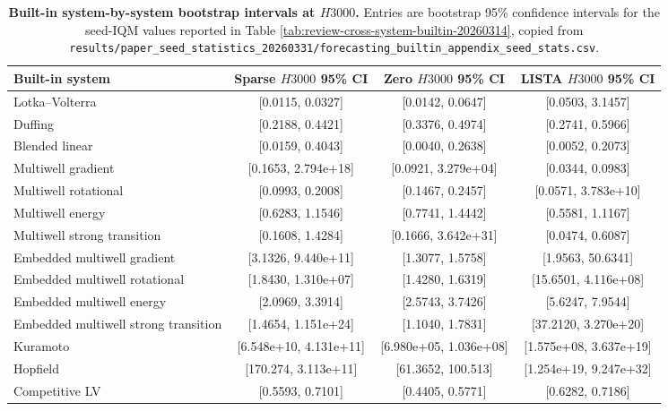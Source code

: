 \begin{table}[ht]
\centering
\tiny
\setlength{\tabcolsep}{4pt}
\begin{tabular}{p{}ccc}
\toprule
Built-in system & Sparse $H3000$ 95\% CI & Zero $H3000$ 95\% CI & LISTA $H3000$ 95\% CI \\
\midrule
Lotka--Volterra & [0.0115, 0.0327] & [0.0142, 0.0647] & [0.0503, 3.1457] \\
Duffing & [0.2188, 0.4421] & [0.3376, 0.4974] & [0.2741, 0.5966] \\
Blended linear & [0.0159, 0.4043] & [0.0040, 0.2638] & [0.0052, 0.2073] \\
Multiwell gradient & [0.1653, 2.794e+18] & [0.0921, 3.279e+04] & [0.0344, 0.0983] \\
Multiwell rotational & [0.0993, 0.2008] & [0.1467, 0.2457] & [0.0571, 3.783e+10] \\
Multiwell energy & [0.6283, 1.1546] & [0.7741, 1.4442] & [0.5581, 1.1167] \\
Multiwell strong transition & [0.1608, 1.4284] & [0.1666, 3.642e+31] & [0.0474, 0.6087] \\
Embedded multiwell gradient & [3.1326, 9.440e+11] & [1.3077, 1.5758] & [1.9563, 50.6341] \\
Embedded multiwell rotational & [1.8430, 1.310e+07] & [1.4280, 1.6319] & [15.6501, 4.116e+08] \\
Embedded multiwell energy & [2.0969, 3.3914] & [2.5743, 3.7426] & [5.6247, 7.9544] \\
Embedded multiwell strong transition & [1.4654, 1.151e+24] & [1.1040, 1.7831] & [37.2120, 3.270e+20] \\
Kuramoto & [6.548e+10, 4.131e+11] & [6.980e+05, 1.036e+08] & [1.575e+08, 3.637e+19] \\
Hopfield & [170.274, 3.113e+11] & [61.3652, 100.513] & [1.254e+19, 9.247e+32] \\
Competitive LV & [0.5593, 0.7101] & [0.4405, 0.5771] & [0.6282, 0.7186] \\
\bottomrule
\end{tabular}
\caption{\textbf{Built-in system-by-system bootstrap intervals at $H3000$.} Entries are bootstrap 95\% confidence intervals for the seed-IQM values reported in Table \ref{tab:review-cross-system-builtin-20260314}, copied from \texttt{results/paper\_seed\_statistics\_20260331/forecasting\_builtin\_appendix\_seed\_stats.csv}.}
\label{tab:review-cross-system-builtin-ci-h3000-20260314}
\end{table}

